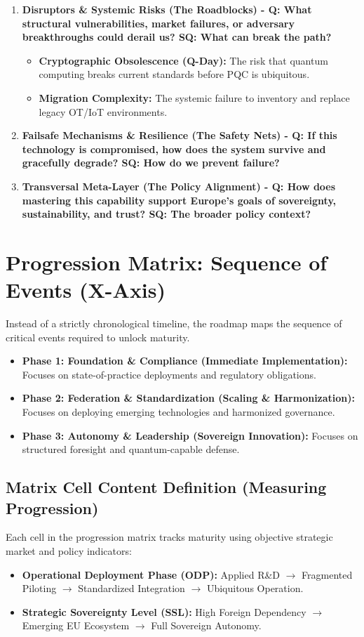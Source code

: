 \documentclass[12pt,a4paper]{report}
\begin{document}
\begin{enumerate}
    \item \textbf{Disruptors \& Systemic Risks (The Roadblocks) - Q: What structural vulnerabilities, market failures, or adversary breakthroughs could derail us? SQ: What can break the path?}
    \begin{itemize}
        \item \textbf{Cryptographic Obsolescence (Q-Day):} The risk that quantum computing breaks current standards before PQC is ubiquitous.
        \item \textbf{Migration Complexity:} The systemic failure to inventory and replace legacy OT/IoT environments.
    \end{itemize}

    \item \textbf{Failsafe Mechanisms \& Resilience (The Safety Nets) - Q: If this technology is compromised, how does the system survive and gracefully degrade? SQ: How do we prevent failure?}

    \item \textbf{Transversal Meta-Layer (The Policy Alignment) - Q: How does mastering this capability support Europe's goals of sovereignty, sustainability, and trust? SQ: The broader policy context?}
\end{enumerate}

\section{Progression Matrix: Sequence of Events (X-Axis)}
Instead of a strictly chronological timeline, the roadmap maps the sequence of critical events required to unlock maturity.

\begin{itemize}
    \item \textbf{Phase 1: Foundation \& Compliance (Immediate Implementation):} Focuses on state-of-practice deployments and regulatory obligations.
    \item \textbf{Phase 2: Federation \& Standardization (Scaling \& Harmonization):} Focuses on deploying emerging technologies and harmonized governance.
    \item \textbf{Phase 3: Autonomy \& Leadership (Sovereign Innovation):} Focuses on structured foresight and quantum-capable defense.
\end{itemize}

\subsection*{Matrix Cell Content Definition (Measuring Progression)}
Each cell in the progression matrix tracks maturity using objective strategic market and policy indicators:
\begin{itemize}
    \item \textbf{Operational Deployment Phase (ODP):} Applied R\&D $\rightarrow$ Fragmented Piloting $\rightarrow$ Standardized Integration $\rightarrow$ Ubiquitous Operation.
    \item \textbf{Strategic Sovereignty Level (SSL):} High Foreign Dependency $\rightarrow$ Emerging EU Ecosystem $\rightarrow$ Full Sovereign Autonomy.
\end{itemize}
\end{document}
